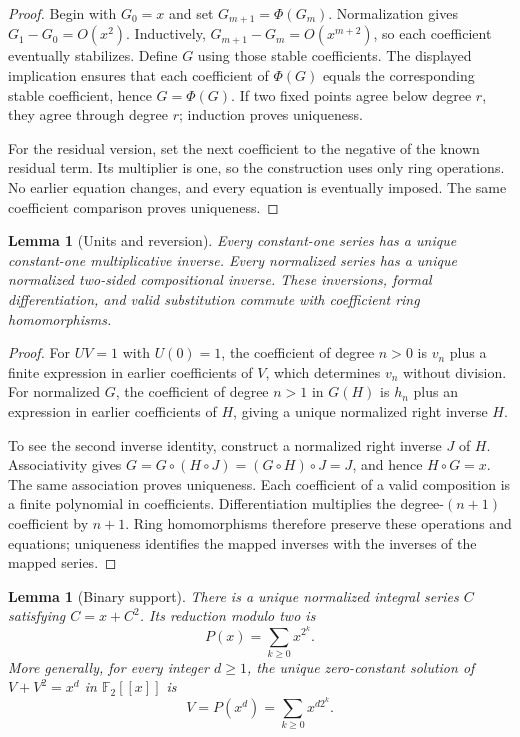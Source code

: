 \documentclass[11pt,a4paper]{article}
\newtheorem{lemma}[theorem]{Lemma}
\theoremstyle{remark}
\newcommand{\F}{\mathbb F}
\newcommand{\ps}[1]{#1[[x]]}
\begin{document}
\begin{proof}
Begin with $G_0=x$ and set $G_{m+1}=\Phi(G_m)$. Normalization gives
$G_1-G_0=O(x^2)$. Inductively,
$G_{m+1}-G_m=O(x^{m+2})$, so each coefficient eventually stabilizes.
Define $G$ using those stable coefficients. The displayed implication
ensures that each coefficient of $\Phi(G)$ equals the corresponding stable
coefficient, hence $G=\Phi(G)$. If two fixed points agree below degree
$r$, they agree through degree $r$; induction proves uniqueness.

For the residual version, set the next coefficient to the negative of the
known residual term. Its multiplier is one, so the construction uses only
ring operations. No earlier equation changes, and every equation is
eventually imposed. The same coefficient comparison proves uniqueness.
\end{proof}

\begin{lemma}[Units and reversion]\label{lem:inverse}
Every constant-one series has a unique constant-one multiplicative
inverse. Every normalized series has a unique normalized two-sided
compositional inverse. These inversions, formal differentiation, and
valid substitution commute with coefficient ring homomorphisms.
\end{lemma}

\begin{proof}
For $UV=1$ with $U(0)=1$, the coefficient of degree $n>0$ is $v_n$ plus
a finite expression in earlier coefficients of $V$, which determines
$v_n$ without division. For normalized $G$, the coefficient of degree
$n>1$ in $G(H)$ is $h_n$ plus an expression in earlier coefficients of
$H$, giving a unique normalized right inverse $H$.

To see the second inverse identity, construct a normalized right inverse
$J$ of $H$. Associativity gives
$G=G\circ(H\circ J)=(G\circ H)\circ J=J$, and hence $H\circ G=x$.
The same association proves uniqueness. Each coefficient of a valid
composition is a finite polynomial in coefficients. Differentiation
multiplies the degree-$(n+1)$ coefficient by $n+1$. Ring homomorphisms
therefore preserve these operations and equations; uniqueness identifies
the mapped inverses with the inverses of the mapped series.
\end{proof}

\begin{lemma}[Binary support]\label{lem:binary}
There is a unique normalized integral series $C$ satisfying $C=x+C^2$.
Its reduction modulo two is
\[
 P(x)=\sum_{k\ge0}x^{2^k}.
\]
More generally, for every integer $d\ge1$, the unique zero-constant
solution of $V+V^2=x^d$ in $\ps{\F_2}$ is
\[
 V=P(x^d)=\sum_{k\ge0}x^{d2^k}.
\]
\end{lemma}
\end{document}
